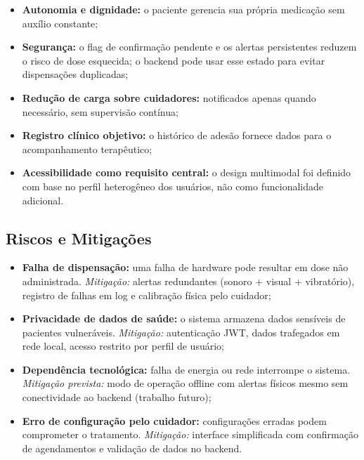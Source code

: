 \documentclass[12pt,a4paper]{article}
\begin{document}
\begin{itemize}
    \item \textbf{Autonomia e dignidade:} o paciente gerencia sua própria medicação sem auxílio constante;
    \item \textbf{Segurança:} o flag de confirmação pendente e os alertas persistentes reduzem o risco de dose esquecida; o backend pode usar esse estado para evitar dispensações duplicadas;
    \item \textbf{Redução de carga sobre cuidadores:} notificados apenas quando necessário, sem supervisão contínua;
    \item \textbf{Registro clínico objetivo:} o histórico de adesão fornece dados para o acompanhamento terapêutico;
    \item \textbf{Acessibilidade como requisito central:} o design multimodal foi definido com base no perfil heterogêneo dos usuários, não como funcionalidade adicional.
\end{itemize}

\subsection{Riscos e Mitigações}

\begin{itemize}
    \item \textbf{Falha de dispensação:} uma falha de hardware pode resultar em dose não administrada. \emph{Mitigação:} alertas redundantes (sonoro + visual + vibratório), registro de falhas em log e calibração física pelo cuidador;
    \item \textbf{Privacidade de dados de saúde:} o sistema armazena dados sensíveis de pacientes vulneráveis. \emph{Mitigação:} autenticação JWT, dados trafegados em rede local, acesso restrito por perfil de usuário;
    \item \textbf{Dependência tecnológica:} falha de energia ou rede interrompe o sistema. \emph{Mitigação prevista:} modo de operação offline com alertas físicos mesmo sem conectividade ao backend (trabalho futuro);
    \item \textbf{Erro de configuração pelo cuidador:} configurações erradas podem comprometer o tratamento. \emph{Mitigação:} interface simplificada com confirmação de agendamentos e validação de dados no backend.
\end{itemize}

\newpage

\end{document}
